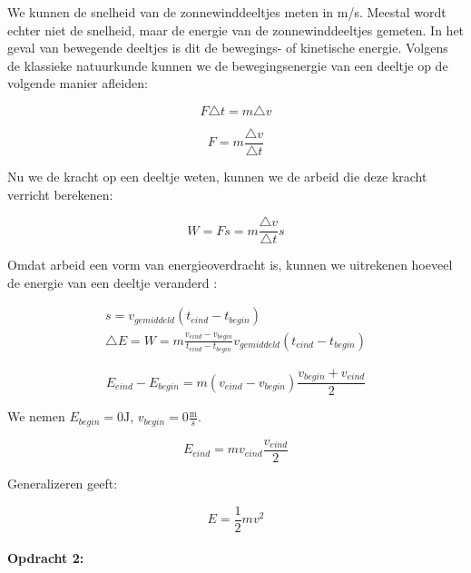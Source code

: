 We kunnen de snelheid van de zonnewinddeeltjes meten in m/s. Meestal
wordt echter niet de snelheid, maar de energie van de zonnewinddeeltjes
gemeten. In het geval van bewegende deeltjes is dit de bewegings-
of kinetische energie. Volgens de klassieke natuurkunde kunnen we
de bewegingsenergie van een deeltje op de volgende manier afleiden:

\begin{equation}
F\triangle t=m\triangle v
\end{equation}


\begin{equation}
F=m\frac{\triangle v}{\triangle t}
\end{equation}


Nu we de kracht op een deeltje weten, kunnen we de arbeid die deze
kracht verricht berekenen:

\begin{equation}
W=Fs=m\frac{\triangle v}{\triangle t}s
\end{equation}


Omdat arbeid een vorm van energieoverdracht is, kunnen we uitrekenen
hoeveel de energie van een deeltje veranderd :

\begin{equation}
\begin{array}{c}
s=v_{gemiddeld}(t_{eind}-t_{begin})\\
\triangle E=W=m\frac{v_{eind}-v_{begin}}{t_{eind}-t_{begin}}v_{gemiddeld}(t_{eind}-t_{begin})
\end{array}
\end{equation}


\begin{equation}
E_{eind}-E_{begin}=m(v_{eind}-v_{begin})\frac{v_{begin}+v_{eind}}{2}
\end{equation}


We nemen $E_{begin}=0\mathrm{J}$, $v_{begin}=0\frac{\mathrm{m}}{s}$.

\begin{equation}
E_{eind}=mv_{eind}\frac{v_{eind}}{2}
\end{equation}


Generalizeren geeft:

\begin{equation}
E=\frac{1}{2}mv^{2}
\end{equation}



\paragraph*{Opdracht 2:}

